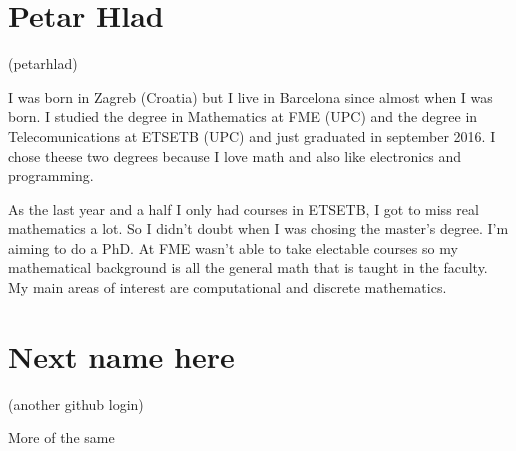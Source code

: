 \documentclass[11pt]{amsart}
\begin{document}
\medskip

\section*{Petar Hlad}
(petarhlad)

I was born in Zagreb (Croatia) but I live in Barcelona since almost when I was born. I studied the degree in Mathematics at FME (UPC) and the degree in Telecomunications at ETSETB (UPC) and just graduated in september 2016. I chose theese two degrees because I love math and also like electronics and programming.

As the last year and a half I only had courses in ETSETB, I got to miss real mathematics a lot. So I didn't doubt when I was chosing the master's degree. I'm aiming to do a PhD.
At FME wasn't able to take electable courses so my mathematical background is all the general math that is taught in the faculty. My main areas of interest are computational and discrete mathematics.

\medskip

\section*{Next name here}
(another github login)

More of the same
\end{document}
